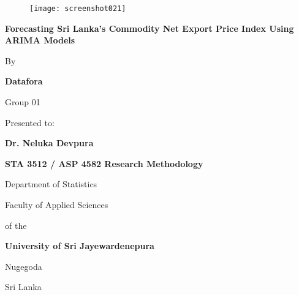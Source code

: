 \documentclass[12pt,a4paper]{report} %
\begin{document}
	
	\onehalfspacing
	
	\begin{titlepage}
		\centering
		
\begin{figure}
	\centering
	\texttt{[image: screenshot021]}
	\end{figure}
		
		{\LARGE \bfseries Forecasting Sri Lanka's Commodity Net 
			Export Price Index Using ARIMA Models \par}\vspace{2cm}
		
		{\large By \par}
		{\Large \bfseries Datafora  \par}
		{\large Group 01 \par}\vspace{1.5cm}
		
		{\large Presented to: \par}
			{\Large \bfseries Dr. Neluka Devpura  \par}\vspace{1.0cm}
			
		{\Large \bfseries STA 3512 / ASP 4582 Research
			Methodology \par}
		
		{\large Department of Statistics \par}
		{\large Faculty of Applied Sciences \par}
		{\large of the \par}
		{\Large \bfseries University of Sri Jayewardenepura \par}
		{\large Nugegoda \par}
		{\large Sri Lanka \par}
		
		\vfill
		
	\end{titlepage}
	
	\doublespacing
	
	
	
	\clearpage
	
\end{document}
